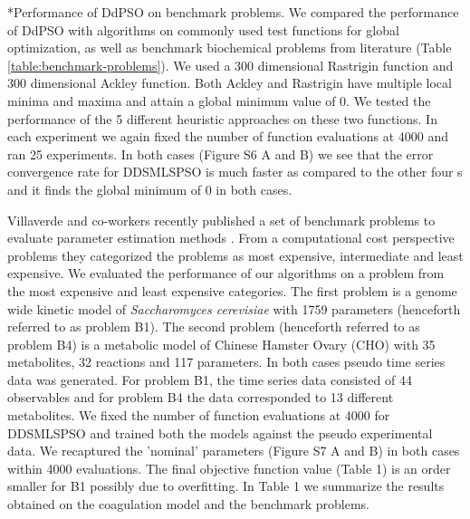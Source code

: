 \documentclass[12pt]{article}
\makeatletter
\renewcommand\subsection{\@startsection
	{subsection}{2}{0mm}
	{-0.05in}
	{-0.5\baselineskip}
	{\normalfont\normalsize\bfseries}}
\makeatother
\begin{document}
\subsection*{Performance of DdPSO on benchmark problems.}
We compared the performance of DdPSO with algorithms on commonly used test functions for global optimization, as well as benchmark biochemical problems from literature (Table \ref{table:benchmark-problems}). We used a 300 dimensional Rastrigin function and 300 dimensional Ackley function. Both Ackley and Rastrigin have multiple local minima and maxima and attain a global minimum value of 0. We tested the performance of the 5 different heuristic approaches on these two functions. In each experiment we again fixed the number of function evaluations at 4000 and ran 25 experiments. In both cases (Figure S6 A and B) we see that the error convergence rate for DDSMLSPSO is much faster as compared to the other four s and it finds the global minimum of 0 in both cases.

Villaverde and co-workers recently published a set of benchmark problems to evaluate parameter estimation methods \cite{villaverde2015biopredyn}. From a computational cost perspective problems they categorized the problems as most expensive, intermediate and least expensive. We evaluated the performance of our algorithms on a problem from the most expensive and least expensive categories. The first problem is a genome wide kinetic model of \textit{Saccharomyces cerevisiae} with 1759 parameters (henceforth referred to as problem B1).  The second problem (henceforth referred to as problem B4) is a metabolic model of Chinese Hamster Ovary (CHO) with 35 metabolites, 32 reactions and 117 parameters. In both cases pseudo time series data was generated. For problem B1, the time series data consisted of 44 observables and for problem B4 the data corresponded to 13 different metabolites. We fixed the number of function evaluations at 4000 for DDSMLSPSO and trained both the models against the pseudo experimental data. We recaptured the 'nominal' parameters (Figure S7 A and B)  in both cases within 4000 evaluations. The final objective function value (Table 1) is an order smaller for B1 possibly due to overfitting. In Table 1 we summarize the results obtained on the coagulation model and the benchmark problems.
\end{document}
